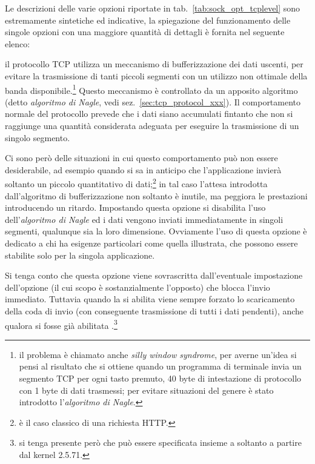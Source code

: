 Le descrizioni delle varie opzioni riportate in
tab.~\ref{tab:sock_opt_tcplevel} sono estremamente sintetiche ed indicative,
la spiegazione del funzionamento delle singole opzioni con una maggiore
quantità di dettagli è fornita nel seguente elenco:
\begin{basedescript}{\desclabelwidth{1.5cm}\desclabelstyle{\nextlinelabel}}

\item[\constd{TCP\_NODELAY}] il protocollo TCP utilizza un meccanismo di
  bufferizzazione dei dati uscenti, per evitare la trasmissione di tanti
  piccoli segmenti con un utilizzo non ottimale della banda
  disponibile.\footnote{il problema è chiamato anche
     \textit{silly window syndrome}, per averne
    un'idea si pensi al risultato che si ottiene quando un programma di
    terminale invia un segmento TCP per ogni tasto premuto, 40 byte di
    intestazione di protocollo con 1 byte di dati trasmessi; per evitare
    situazioni del genere è stato introdotto 
    l'\textsl{algoritmo di Nagle}.}  Questo meccanismo è controllato da un
  apposito algoritmo (detto \textsl{algoritmo di Nagle}, vedi
  sez.~\ref{sec:tcp_protocol_xxx}).  Il comportamento normale del protocollo
  prevede che i dati siano accumulati fintanto che non si raggiunge una
  quantità considerata adeguata per eseguire la trasmissione di un singolo
  segmento.

  Ci sono però delle situazioni in cui questo comportamento può non essere
  desiderabile, ad esempio quando si sa in anticipo che l'applicazione invierà
  soltanto un piccolo quantitativo di dati;\footnote{è il caso classico di una
    richiesta HTTP.} in tal caso l'attesa introdotta dall'algoritmo di
  bufferizzazione non soltanto è inutile, ma peggiora le prestazioni
  introducendo un ritardo.  Impostando questa opzione si disabilita l'uso
  dell'\textsl{algoritmo di Nagle} ed i dati vengono inviati immediatamente in
  singoli segmenti, qualunque sia la loro dimensione.  Ovviamente l'uso di
  questa opzione è dedicato a chi ha esigenze particolari come quella
  illustrata, che possono essere stabilite solo per la singola applicazione.

  Si tenga conto che questa opzione viene sovrascritta dall'eventuale
  impostazione dell'opzione  (il cui scopo è sostanzialmente
  l'opposto) che blocca l'invio immediato. Tuttavia quando la si abilita viene
  sempre forzato lo scaricamento della coda di invio (con conseguente
  trasmissione di tutti i dati pendenti), anche qualora si fosse già abilitata
  .\footnote{si tenga presente però che  può
    essere specificata insieme a  soltanto a partire dal
    kernel 2.5.71.}


\end{basedescript}
